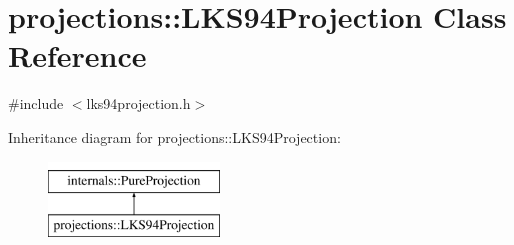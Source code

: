 \hypertarget{classprojections_1_1_l_k_s94_projection}{\section{projections\-:\-:L\-K\-S94\-Projection Class Reference}
\label{classprojections_1_1_l_k_s94_projection}
}


{\ttfamily \#include $<$lks94projection.\-h$>$}

Inheritance diagram for projections\-:\-:L\-K\-S94\-Projection\-:\begin{figure}[H]
\begin{center}
\leavevmode
\includegraphics[height=2.000000cm]{classprojections_1_1_l_k_s94_projection}
\end{center}
\end{figure}
